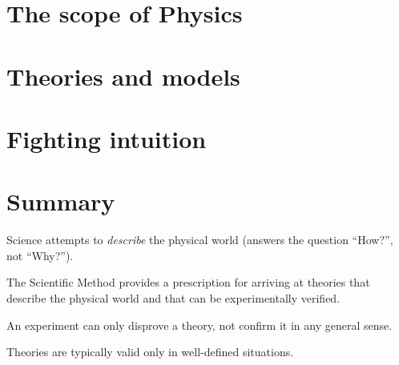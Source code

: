 \section{The scope of Physics}

\section{Theories and models}

\section{Fighting intuition}

\section{Summary}
\begin{chapterSummary}
\item Science attempts to \textit{describe} the physical world (answers the question ``How?'', not ``Why?'').
\item The Scientific Method provides a prescription for arriving at theories that describe the physical world and that can be experimentally verified.
\item An experiment can only disprove a theory, not confirm it in any general sense.
\item Theories are typically valid only in well-defined situations.
\end{chapterSummary}